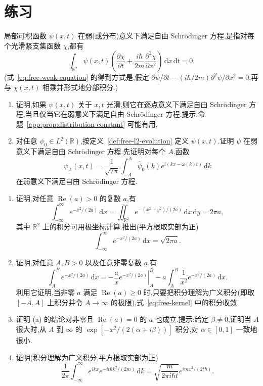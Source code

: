 \section{练习}\label{sec:chapter4-exercises}

\begin{exercise}\label{ex:free-weak-solution}
局部可积函数 \(\psi(x,t)\) 在弱(或分布)意义下满足自由 Schrödinger 方程,是指对每个光滑紧支集函数 \(\chi\),都有
\begin{equation}
\int_{\mathbb{R}^{2}}\psi(x,t)\left(\frac{\partial\chi}{\partial t}
+\frac{i\hbar}{2m}\frac{\partial^{2}\chi}{\partial x^{2}}\right)\,\mathrm{d}x\,\mathrm{d}t=0.
\label{eq:free-weak-equation}
\end{equation}
(式~\eqref{eq:free-weak-equation} 的得到方式是,假定 \(\partial\psi/\partial t-(i\hbar/2m)\partial^{2}\psi/\partial x^{2}=0\),再与 \(\chi(x,t)\) 相乘并形式地分部积分.)
\begin{enumerate}
\item 证明,如果 \(\psi(x,t)\) 关于 \(x,t\) 光滑,则它在逐点意义下满足自由 Schrödinger 方程,当且仅当它在弱意义下满足自由 Schrödinger 方程.提示:命题~\ref{app:prop:distribution-constant} 可能有用.
\item 对任意 \(\psi_{0}\in L^{2}(\mathbb{R})\),按定义~\ref{def:free-l2-evolution} 定义 \(\psi(x,t)\).证明 \(\psi\) 在弱意义下满足自由 Schrödinger 方程.先证明对每个 \(A\),函数
\[
\psi_{A}(x,t)=\frac{1}{\sqrt{2\pi}}\int_{-A}^{A}
\widehat{\psi}_{0}(k)e^{i(kx-\omega(k)t)}\,\mathrm{d}k
\]
在弱意义下满足自由 Schrödinger 方程.
\end{enumerate}
\end{exercise}

\begin{exercise}\label{ex:free-gaussian-integral}
\begin{enumerate}
\item 证明,对任意 \(\operatorname{Re}(a)>0\) 的复数 \(a\),有
\[
\int_{-\infty}^{\infty}e^{-x^{2}/(2a)}\,\mathrm{d}x
=\iint_{\mathbb{R}^{2}}e^{-(x^{2}+y^{2})/(2a)}\,\mathrm{d}x\,\mathrm{d}y
=2\pi a,
\]
其中 \(\mathbb{R}^{2}\) 上的积分可用极坐标计算.推出(平方根取实部为正)
\[
\int_{-\infty}^{\infty}e^{-x^{2}/(2a)}\,\mathrm{d}x=\sqrt{2\pi a}.
\]
\item 证明,对任意 \(A,B>0\) 以及任意非零复数 \(a\),有
\[
\int_{A}^{B}e^{-x^{2}/(2a)}\,\mathrm{d}x
=\left.-\frac{a}{x}e^{-x^{2}/(2a)}\right|_{A}^{B}
-a\int_{A}^{B}\frac{1}{x^{2}}e^{-x^{2}/(2a)}\,\mathrm{d}x.
\]
利用它证明,当非零 \(a\) 满足 \(\operatorname{Re}(a)\ge0\) 时,只要把积分理解为广义积分(即取 \([-A,A]\) 上积分并令 \(A\to\infty\) 的极限),式~\eqref{eq:free-kernel} 中的积分收敛.
\item 证明 (a) 的结论对非零且 \(\operatorname{Re}(a)=0\) 的 \(a\) 也成立.提示:给定 \(\beta\ne0\),证明当 \(A\) 很大时,从 \(A\) 到 \(\infty\) 的 \(\exp[-x^{2}/(2(\alpha+i\beta))]\) 积分,对 \(\alpha\in[0,1]\) 一致地很小.
\item 证明(积分理解为广义积分,平方根取实部为正)
\[
\frac{1}{2\pi}\int_{-\infty}^{\infty}e^{ikx}e^{-it\hbar k^{2}/(2m)}\,\mathrm{d}k
=\sqrt{\frac{m}{2\pi i\hbar t}}e^{imx^{2}/(2t\hbar)}.
\]
\end{enumerate}
\end{exercise}

